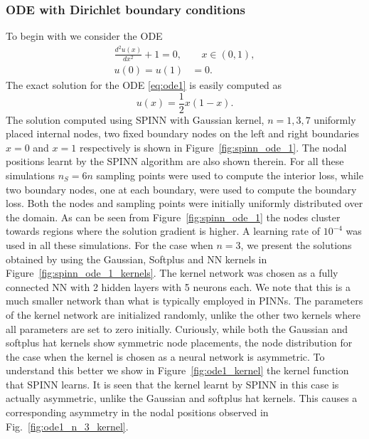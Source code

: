 \documentclass[12pt]{article}
\newcommand{\rb}[1]{#1}
\newcommand{\new}[1]{#1}
\begin{document}
\subsubsection{ODE with Dirichlet boundary conditions}
\new{To begin with we consider the ODE
\begin{equation} \label{eq:ode1}
\begin{split}
\frac{d^2 u(x)}{dx^2} + 1 = 0, &\quad x \in (0,1),\\
u(0) = u(1) &= 0.
\end{split}
\end{equation}
The exact solution for the ODE \eqref{eq:ode1} is easily computed as
\begin{equation} \label{eq:ode1_exact}
u(x) = \frac{1}{2}x(1 - x).
\end{equation}}
\rb{The solution computed using SPINN with Gaussian kernel, $n=1,3,7$ uniformly placed internal nodes, two fixed boundary nodes on the left and right boundaries $x = 0$ and $x = 1$ respectively is shown in Figure~\ref{fig:spinn_ode_1}. The nodal positions learnt by the SPINN algorithm are also shown therein. For all these simulations $n_S = 6n$ sampling points were used to compute the interior loss, while two boundary nodes, one at each boundary, were used to compute the boundary loss. Both the nodes and sampling points were initially uniformly distributed over the domain. As can be seen from Figure~\ref{fig:spinn_ode_1} the nodes cluster towards regions where the solution gradient is higher. A learning rate of $10^{-4}$ was used in all these simulations.} \new{For the case when $n=3$, we present the solutions obtained by using the Gaussian, Softplus and NN kernels in Figure~\ref{fig:spinn_ode_1_kernels}.} \rb{The kernel network was chosen as a fully connected NN with 2 hidden layers with 5 neurons each. We note that this is a much smaller network than what is typically employed in PINNs. The parameters of the kernel network are initialized randomly, unlike the other two kernels where all parameters are set to zero initially.} \new{Curiously, while both the Gaussian and softplus hat kernels show symmetric node placements, the node distribution for the case when the kernel is chosen as a neural network is asymmetric. To understand this better we show in Figure~\ref{fig:ode1_kernel} the kernel function that SPINN learns. It is seen that the kernel learnt by SPINN in this case is actually asymmetric, unlike the Gaussian and softplus hat kernels. This causes a corresponding asymmetry in the nodal positions observed in Fig.~\ref{fig:ode1_n_3_kernel}.}
\end{document}
